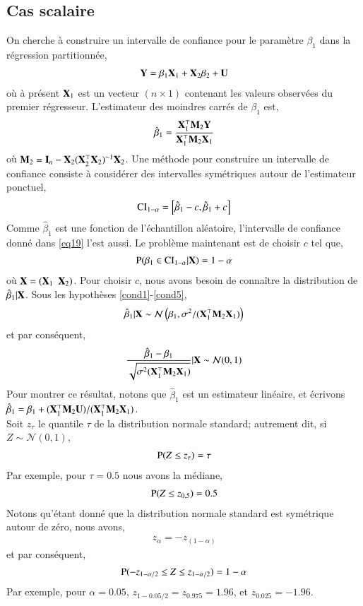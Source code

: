 \documentclass[10pt, reqno]{amsart}
\begin{document}
\subsection{Cas scalaire}
On cherche à construire un intervalle de confiance pour le paramètre $\beta_1$ dans la régression partitionnée,
\begin{align*}
\mathbf Y = \beta_1\mathbf X_1+\mathbf X_2\beta_2 + \mathbf U
\end{align*}
où à présent $\mathbf X_1$ est un vecteur $(n\times 1)$ contenant les valeurs observées du premier régresseur. L'estimateur des moindres carrés de $\beta_1$ est,
\begin{align*}
\hat{\beta}_1 = \frac{\mathbf X_1^\top\mathbf M_2\mathbf Y}{\mathbf X_1^\top\mathbf M_2\mathbf X_1}
\end{align*}
où $\mathbf M_2 = \mathbf{I}_n - \mathbf X_2(\mathbf X_2^\top\mathbf X_2)^{-1}\mathbf X_2$. Une méthode pour construire un intervalle de confiance consiste à considérer des intervalles symétriques autour de l'estimateur ponctuel,
\begin{align}
\mathrm{CI}_{1-\alpha} = \left[\hat{\beta}_1- c,  \hat{\beta}_1+c\right]
\label{eq19}
\end{align}
Comme $\hat{\beta}_1$ est une fonction de l'échantillon aléatoire, l'intervalle de confiance donné dans \eqref{eq19} l'est aussi. Le problème maintenant est de choisir $c$ tel que,
\begin{align*}
\operatorname{P}(\beta_1 \in \mathrm{CI}_{1-\alpha}| \mathbf X) = 1-\alpha
\end{align*}
où $\mathbf X = (\mathbf X_1 \ \ \mathbf X_2)$. Pour choisir $c$, nous avons besoin de connaître la distribution de $\hat{\beta}_1|\mathbf X$. Sous les hypothèses \ref{cond1}-\ref{cond5},
\begin{align*}
\hat{\beta}_1|\mathbf X \sim \mathcal{N}\left(\beta_1, \sigma^2/(\mathbf X_1^\top\mathbf M_2\mathbf X_1)\right)
\end{align*}
et par conséquent,
\begin{align}
\frac{\hat{\beta}_1-\beta_1 }{\sqrt{\sigma^2
(\mathbf X_1^\top\mathbf M_2\mathbf X_1)}} | \mathbf X \sim \mathcal{N}(0, 1)
\label{eq20}
\end{align}
Pour montrer ce résultat, notons que $\hat{\beta}_1$ est un estimateur linéaire, et écrivons $\hat{\beta}_1 = \beta_1 + (\mathbf X_1^\top\mathbf M_2\mathbf U) / (\mathbf X_1^\top\mathbf M_2\mathbf X_1)$.\\
Soit $z_\tau$ le quantile $\tau$ de la distribution normale standard; autrement dit, si $Z\sim \mathcal{N}(0,1)$,
\begin{align*}
\operatorname{P}(Z \leq z_\tau) = \tau
\end{align*}
Par exemple, pour $\tau = 0.5$ nous avons la médiane,
\begin{align*}
\operatorname{P}(Z \leq z_{0.5}) = 0.5
\end{align*}
Notons qu'étant donné que la distribution normale standard est symétrique autour de zéro, nous avons,
\begin{align*}
z_\alpha = -z_{(1-\alpha)}
\end{align*}
et par conséquent,
\begin{align*}
\operatorname{P}(-z_{1 - \alpha/2}\leq Z\leq z_{1-\alpha/2}) = 1-\alpha
\end{align*}
Par exemple, pour $\alpha=0.05$, $z_{1 - 0.05/2} = z_{0.975} = 1.96$, et $z_{0.025} = -1.96$.
\end{document}
